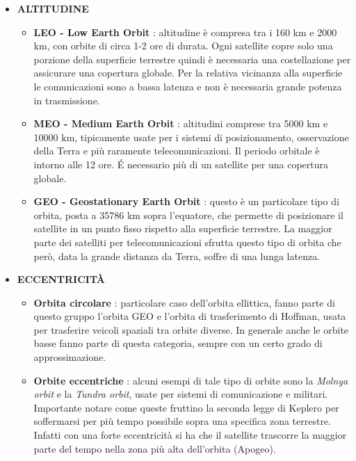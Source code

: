 \documentclass[12pt,a4paper,oneside]{book}
\begin{document}
			
			\begin{itemize}

				\item {\bf ALTITUDINE}
					\begin{itemize}
						\item {\bf LEO - Low Earth Orbit}
						: altitudine è compresa tra i 160 km e 2000 km, con orbite di circa 1-2 ore di durata. Ogni satellite copre solo una porzione della superficie terrestre quindi è necessaria una costellazione per assicurare una copertura globale. Per la relativa vicinanza alla superficie le comunicazioni sono a bassa latenza e non è necessaria grande potenza in trasmissione.
						\item {\bf MEO - Medium Earth Orbit}
						: altitudini comprese tra 5000 km e 10000 km, tipicamente usate per i sistemi di posizionamento, osservazione della Terra e più raramente telecomunicazioni. Il periodo orbitale è intorno alle 12 ore. \'E necessario più di un satellite per una copertura globale.				
						\item {\bf GEO - Geostationary Earth Orbit}
						: questo è un particolare tipo di orbita, posta a 35786 km sopra l'equatore, che permette di posizionare il satellite in un punto fisso rispetto alla superficie terrestre. La maggior parte dei satelliti per telecomunicazioni sfrutta questo tipo di orbita che però, data la grande distanza da Terra, soffre di una lunga latenza.
					\end{itemize}
					
				\item{\bf ECCENTRICITÀ}	
					\begin{itemize}
						\item \textbf{Orbita circolare} : particolare caso dell'orbita ellittica, fanno parte di questo gruppo l'orbita GEO e l'orbita di trasferimento di Hoffman, usata per trasferire veicoli spaziali tra orbite diverse. In generale anche le orbite basse fanno parte di questa categoria, sempre con un certo grado di approssimazione.
						\item \textbf{Orbite eccentriche} : alcuni esempi di tale tipo di orbite sono la \textit{Molnya orbit} e la \textit{Tundra orbit}, usate per sistemi di comunicazione e militari.
						Importante notare come queste fruttino la seconda legge di Keplero per soffermarsi per più tempo possibile sopra una specifica zona terrestre. Infatti con una forte eccentricità si ha che il satellite trascorre la maggior parte del tempo nella zona più alta dell'orbita (Apogeo). 								
					\end{itemize}
					

\end{itemize}
\end{document}
